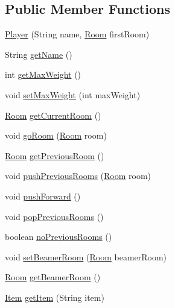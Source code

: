\subsection*{Public Member Functions}
\begin{DoxyCompactItemize}
\item 
\hyperlink{classpkg__world_1_1Player_a8a48bf28cae733a412a0114802a1e4fb}{Player} (String name, \hyperlink{classpkg__world_1_1Room}{Room} first\-Room)
\item 
String \hyperlink{classpkg__world_1_1Player_afb52f93ed1c1ee43462f0c33ca3abcf0}{get\-Name} ()
\item 
int \hyperlink{classpkg__world_1_1Player_a700bc1762736bd44d91e40ad9ae2ff76}{get\-Max\-Weight} ()
\item 
void \hyperlink{classpkg__world_1_1Player_a6218134478709a2e1c4438f2c9f94b8a}{set\-Max\-Weight} (int max\-Weight)
\item 
\hyperlink{classpkg__world_1_1Room}{Room} \hyperlink{classpkg__world_1_1Player_a5ff0ede152d97c0c9cf6603c9a422a77}{get\-Current\-Room} ()
\item 
void \hyperlink{classpkg__world_1_1Player_af694ca81b712f2ba0e18c3ae73c03bd4}{go\-Room} (\hyperlink{classpkg__world_1_1Room}{Room} room)
\item 
\hyperlink{classpkg__world_1_1Room}{Room} \hyperlink{classpkg__world_1_1Player_adcff90c8c1b6fd5dcb3c4516d7e3a277}{get\-Previous\-Room} ()
\item 
void \hyperlink{classpkg__world_1_1Player_a6b419da985921727891cee03e4a7e755}{push\-Previous\-Rooms} (\hyperlink{classpkg__world_1_1Room}{Room} room)
\item 
void \hyperlink{classpkg__world_1_1Player_af97dc9ce2806115a09ab6a3ba08ed673}{push\-Forward} ()
\item 
void \hyperlink{classpkg__world_1_1Player_a4ef9377c34206c64ef1086de669ca5f1}{pop\-Previous\-Rooms} ()
\item 
boolean \hyperlink{classpkg__world_1_1Player_abe1633071742e8825d40317150f66835}{no\-Previous\-Rooms} ()
\item 
void \hyperlink{classpkg__world_1_1Player_a6dc6248fa7cbe281e9a7c5d6b86f242c}{set\-Beamer\-Room} (\hyperlink{classpkg__world_1_1Room}{Room} beamer\-Room)
\item 
\hyperlink{classpkg__world_1_1Room}{Room} \hyperlink{classpkg__world_1_1Player_a81893b37cd26426863087f353f8be3ab}{get\-Beamer\-Room} ()
\item 
\hyperlink{classpkg__world_1_1pkg__items_1_1Item}{Item} \hyperlink{classpkg__world_1_1Player_a913aab92cf289f5278e6e995e7a4d118}{get\-Item} (String item)

\end{DoxyCompactItemize}
